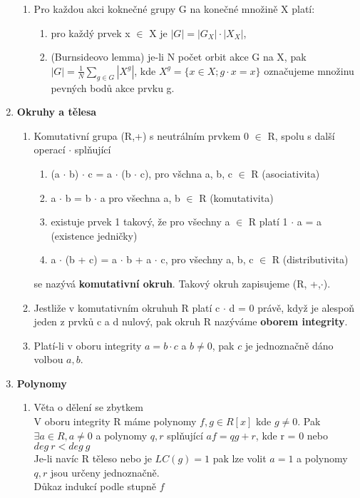 \documentclass[12pt,a4paper]{article}
\begin{document}
\begin{enumerate}
\begin{enumerate}
		\item Pro každou akci koknečné grupy G na konečné množině X platí:
		\begin{enumerate}
			\item pro každý prvek x $\in$ X je $|G| = |G_X|\cdot |X_X|$,
			\item (Burnsideovo lemma) je-li N počet orbit akce G na X, pak $|G| = \frac{1}{N}\sum_{g\in G}|X^g|$, kde $X^g = \{x \in X; g\cdot x = x\}$ označujeme množinu pevných bodů akce prvku g.
		\end{enumerate}
	\end{enumerate}

	\item \textbf{Okruhy a tělesa}
	\begin{enumerate}
		\item Komutativní grupa (R,+) s neutrálním prvkem 0 $\in$ R, spolu s další operací $\cdot$ splňující
		 \begin{enumerate}
		 	\item (a $\cdot$ b) $\cdot$ c = a $\cdot$ (b $\cdot$ c), pro všchna a, b, c $\in$ R (asociativita)
		 	\item a $\cdot$ b = b $\cdot$ a pro všechna a, b $\in$ R (komutativita)
		 	\item existuje prvek 1 takový, že pro všechny a $\in$ R platí 1 $\cdot$ a = a (existence jedničky)
		 	\item a $\cdot$ (b + c) = a $\cdot$ b + a $\cdot$ c, pro všechny a, b, c $\in$ R (distributivita)
		 \end{enumerate}
	 	se nazývá \textbf{komutativní okruh}. Takový okruh zapisujeme (R, +,$\cdot$).
	 	
	 	\item Jestliže v komutativním okruhuh R platí c $\cdot$ d = 0 právě, když je alespoň jeden z prvků c a d nulový, pak okruh R nazýváme \textbf{oborem integrity}.
	 	
	 	\item Platí-li v oboru integrity $a=b\cdot c$ a $b\neq0$, pak $c$ je jednoznačně dáno volbou $a,b$.
	\end{enumerate}
	
	\item \textbf{Polynomy}
		\begin{enumerate}
			\item Věta o dělení se zbytkem\\
				V oboru integrity R máme polynomy $f, g \in R[x] $ kde $g \neq 0$. Pak $\exists a \in R, a \neq 0$ a polynomy $q, r$ splňující $af=qg+r$, kde r = 0 nebo $deg~r < deg~g$ \\Je-li navíc R těleso nebo je $LC(g)  = 1$ pak lze volit $a=1$ a polynomy $q,r$ jsou určeny jednoznačně.\\Důkaz indukcí podle stupně $f$
			

\end{enumerate}
\end{enumerate}
\end{document}
